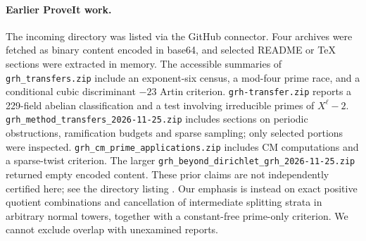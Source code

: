 \documentclass[11pt]{article}
\theoremstyle{remark}\newtheorem{remark}[theorem]{Remark}
\begin{document}
\paragraph{Earlier ProveIt work.} The incoming directory was listed via the GitHub connector. Four archives were fetched as binary content encoded in base64, and selected README or TeX sections were extracted in memory. The accessible summaries of \texttt{grh\_transfers.zip} include an exponent-six census, a mod-four prime race, and a conditional cubic discriminant $-23$ Artin criterion. \texttt{grh-transfer.zip} reports a 229-field abelian classification and a test involving irreducible primes of $X^\ell-2$. \nolinkurl{grh_method_transfers_2026-11-25.zip} includes sections on periodic obstructions, ramification budgets and sparse sampling; only selected portions were inspected. \nolinkurl{grh_cm_prime_applications.zip} includes CM computations and a sparse-twist criterion. The larger \nolinkurl{grh_beyond_dirichlet_grh_2026-11-25.zip} returned empty encoded content. These prior claims are not independently certified here; see the directory listing \cite{prior}. Our emphasis is instead on exact positive quotient combinations and cancellation of intermediate splitting strata in arbitrary normal towers, together with a constant-free prime-only criterion. We cannot exclude overlap with unexamined reports.
\end{document}
